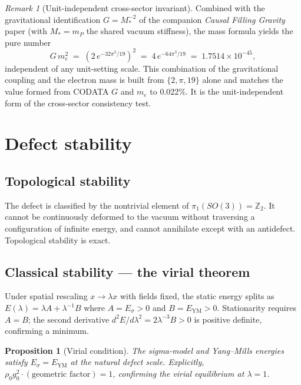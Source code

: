 \documentclass[12pt]{article}
\newtheorem{proposition}[theorem]{Proposition}
\theoremstyle{definition}
\theoremstyle{remark}
\newtheorem{remark}[theorem]{Remark}
\begin{document}
\begin{remark}[Unit-independent cross-sector invariant]
\label{rem:Gme2}
Combined with the gravitational identification $G=M_*^{-2}$ of the companion
\emph{Causal Filling Gravity} paper (with $M_*=m_P$ the shared vacuum
stiffness), the mass formula yields the pure number
\begin{equation}
G\,m_e^2\;=\;\left(2\,e^{-32\pi^3/19}\right)^2\;=\;4\,e^{-64\pi^3/19}
\;=\;1.7514\times10^{-45},
\label{eq:Gme2}
\end{equation}
independent of any unit-setting scale. This combination of the gravitational
coupling and the electron mass is built from $\{2,\pi,19\}$ alone and matches
the value formed from CODATA $G$ and $m_e$ to $0.022\%$. It is the
unit-independent form of the cross-sector consistency test.
\end{remark}

\section{Defect stability}
\label{sec:stability}

\subsection{Topological stability}

The defect is classified by the nontrivial element of
$\pi_1(SO(3))=\mathbb{Z}_2$.  It cannot be continuously deformed to the
vacuum without traversing a configuration of infinite energy, and cannot
annihilate except with an antidefect.  Topological stability is exact.

\subsection{Classical stability — the virial theorem}

Under spatial rescaling $x\to\lambda x$ with fields fixed, the static energy
splits as $E(\lambda)=\lambda A+\lambda^{-1}B$ where $A=E_\sigma>0$ and
$B=E_{\mathrm{YM}}>0$.  Stationarity requires $A=B$; the second derivative
$d^2E/d\lambda^2=2\lambda^{-3}B>0$ is positive definite, confirming a
minimum.

\begin{proposition}[Virial condition]
The sigma-model and Yang--Mills energies satisfy $E_\sigma=E_{\mathrm{YM}}$
at the natural defect scale.  Explicitly,
$\rho_0 g_0^2\cdot(\text{geometric factor})=1$, confirming the virial
equilibrium at $\lambda=1$.
\end{proposition}
\end{document}

